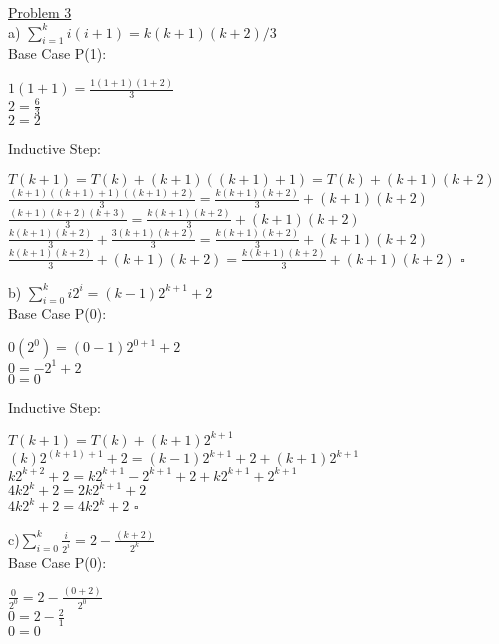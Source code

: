 \documentclass[a4paper,12pt]{article}
\begin{document}
\underline {Problem 3}\\
\indent a) $\sum_{i=1}^k i(i+1) = k(k+1)(k+2)/3$\\

Base Case P(1):\\
\begin{center}
$1(1+1) = \frac{1(1+1)(1+2)}{3}$\\
$2 = \frac{6}{3}$\\
$2 = 2$\\
\end{center}

Inductive Step:
\begin{center}
$T(k+1) = T(k) + (k+1)((k+1) +1) = T(k) + (k+1)(k+2)$\\
$\frac{(k+1)((k+1)+1)((k+1)+2)}{3} = \frac{k(k+1)(k+2)}{3} + (k+1)(k+2)$\\
$\frac{(k+1)(k+2)(k+3)}{3} = \frac{k(k+1)(k+2)}{3} + (k+1)(k+2)$\\
$\frac{k(k+1)(k+2)}{3} + \frac{3(k+1)(k+2)}{3} = \frac{k(k+1)(k+2)}{3} + (k+1)(k+2)$\\
$\frac{k(k+1)(k+2)}{3} + (k+1)(k+2) = \frac{k(k+1)(k+2)}{3} + (k+1)(k+2)$ $\square$\\
\end{center}

b) $\sum_{i=0}^k i2^i = (k-1)2^{k+1} + 2$\\

Base Case P(0):
\begin{center}
$0(2^0) = (0-1)2^{0+1} + 2$\\
$0 = -2^1 + 2$\\
$0 = 0$\\
\end{center}

Inductive Step:
\begin{center}
$T(k+1) = T(k) + (k+1)2^{k+1}$\\
$(k)2^{(k+1)+1} + 2 = (k-1)2^{k+1} + 2 + (k+1)2^{k+1}$\\
$k2^{k+2} + 2 = k2^{k+1} - 2^{k+1} + 2 + k2^{k+1} + 2^{k+1}$\\
$4k2^k + 2 = 2k2^{k+1} + 2$\\
$4k2^k + 2 = 4k2^k + 2$ $\square$\\
\end{center}

c)$\sum_{i=0}^k \frac{i}{2^i} = 2 - \frac{(k+2)}{2^k}$\\

Base Case P(0):
\begin{center}
$\frac{0}{2^0} = 2 - \frac{(0+2)}{2^0}$\\
$0 = 2 - \frac{2}{1}$\\
$0 = 0$\\
\end{center}
\end{document}
